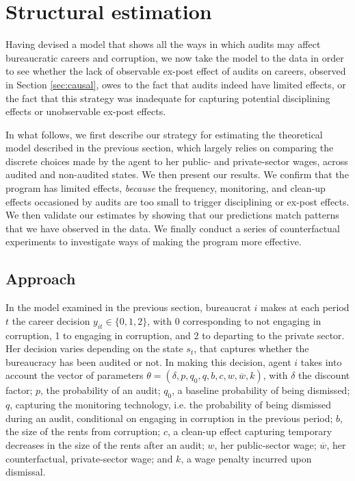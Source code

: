 \documentclass[12pt,a4paper]{article}
\theoremstyle{definition}
\newcommand{\wb}{\overline{w}}
\newcommand{\de}{\delta}
\begin{document}
{\section{Structural estimation}
\label{sec:structural}

Having devised a model that shows all the ways in which audits may affect bureaucratic careers and corruption, we now take the model to the data in order to see whether the lack of observable ex-post effect of audits on careers, observed in Section \ref{sec:causal}, owes to the fact that audits indeed have limited effects, or the fact that this strategy was inadequate for capturing potential disciplining effects or unobservable ex-post effects. 

In what follows, we first describe our strategy for estimating the theoretical model described in the previous section, which largely relies on comparing the discrete choices made by the agent to her public- and private-sector wages, across audited and non-audited states. We then present our results. We confirm that the program has limited effects, \emph{because} the frequency, monitoring, and clean-up effects occasioned by audits are too small to trigger disciplining or ex-post effects. We then validate our estimates by showing that our predictions match patterns that we have observed in the data. We finally conduct a series of counterfactual experiments to investigate ways of making the program more effective. 

\subsection{Approach}
\label{sub:approachStructural}

In the model examined in the previous section, bureaucrat $i$ makes at each period $t$ the career decision $y_{it} \in \{0,1,2\}$, with 0 corresponding to not engaging in corruption, 1 to engaging in corruption, and 2 to departing to the private sector. Her decision varies depending on the state $s_t$, that captures whether the bureaucracy has been audited or not. In making this decision, agent $i$ takes into account the vector of parameters $\theta = (\de, p, q_0, q, b, c, w, \wb, k)$, with $\de$ the discount factor; $p$, the probability of an audit; $q_0$, a baseline probability of being dismissed; $q$, capturing the monitoring technology, i.e. the probability of being dismissed during an audit, conditional on engaging in corruption in the previous period; $b$, the size of the rents from corruption; $c$, a clean-up effect capturing temporary decreases in the size of the rents after an audit; $w$, her public-sector wage; $\wb$, her counterfactual, private-sector wage; and $k$, a wage penalty incurred upon dismissal. 

}
\end{document}
